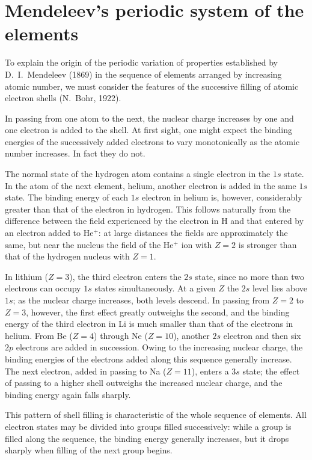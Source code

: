 \section{Mendeleev's periodic system of the elements}

To explain the origin of the periodic variation of properties established by D.~I.~Mendeleev (1869) in the sequence of elements arranged by increasing atomic number, we must consider the features of the successive filling of atomic electron shells (N.~Bohr, 1922).

In passing from one atom to the next, the nuclear charge increases by one and one electron is added to the shell. At first sight, one might expect the binding energies of the successively added electrons to vary monotonically as the atomic number increases. In fact they do not.

The normal state of the hydrogen atom contains a single electron in the $1s$ state. In the atom of the next element, helium, another electron is added in the same $1s$ state. The binding energy of each $1s$ electron in helium is, however, considerably greater than that of the electron in hydrogen. This follows naturally from the difference between the field experienced by the electron in H and that entered by an electron added to He$^+$: at large distances the fields are approximately the same, but near the nucleus the field of the He$^+$ ion with $Z=2$ is stronger than that of the hydrogen nucleus with $Z=1$.

In lithium ($Z=3$), the third electron enters the $2s$ state, since no more than two electrons can occupy $1s$ states simultaneously. At a given $Z$ the $2s$ level lies above $1s$; as the nuclear charge increases, both levels descend. In passing from $Z=2$ to $Z=3$, however, the first effect greatly outweighs the second, and the binding energy of the third electron in Li is much smaller than that of the electrons in helium. From Be ($Z=4$) through Ne ($Z=10$), another $2s$ electron and then six $2p$ electrons are added in succession. Owing to the increasing nuclear charge, the binding energies of the electrons added along this sequence generally increase. The next electron, added in passing to Na ($Z=11$), enters a $3s$ state; the effect of passing to a higher shell outweighs the increased nuclear charge, and the binding energy again falls sharply.

This pattern of shell filling is characteristic of the whole sequence of elements. All electron states may be divided into groups filled successively: while a group is filled along the sequence, the binding energy generally increases, but it drops sharply when filling of the next group begins.

